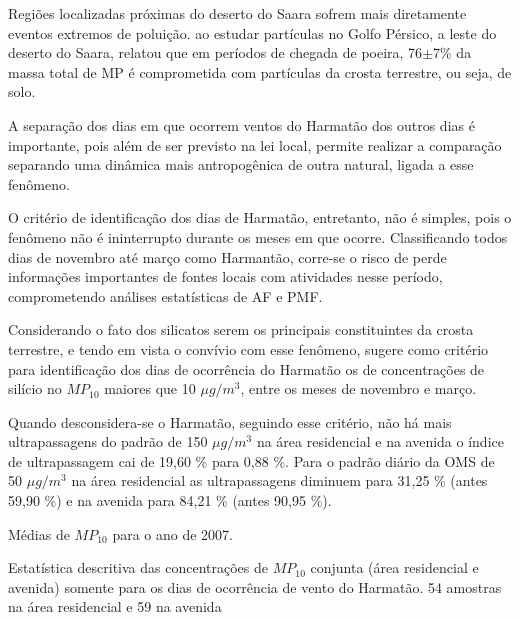 Regiões localizadas próximas do deserto do Saara sofrem mais diretamente 
eventos extremos de poluição. \citet{kaku2016} ao estudar partículas no 
Golfo Pérsico, a leste do deserto do Saara, relatou que em períodos de chegada 
de poeira, 76$\pm$7\% da massa total de MP é comprometida com partículas da 
crosta terrestre, ou seja, de solo.

A separação dos dias em que ocorrem ventos do Harmatão dos outros dias é 
importante, pois além de ser previsto na lei local, permite realizar a 
comparação separando uma dinâmica mais antropogênica de outra natural, 
ligada a esse fenômeno.
  
O critério de identificação dos dias de Harmatão, entretanto, não é simples, 
pois o fenômeno não é ininterrupto durante os meses em que ocorre. 
Classificando todos dias de novembro até março como Harmantão, corre-se o risco
de perde informações importantes de fontes locais com atividades nesse período, 
comprometendo análises estatísticas de AF e PMF. 

Considerando o fato dos silicatos serem os principais constituintes da crosta
terrestre, e tendo em vista o convívio com esse fenômeno, \citet{aboh2009} 
sugere como critério para identificação dos dias de ocorrência do Harmatão 
os de concentrações de silício no $MP_{10}$ maiores que 10 $\mu g/m^3$, 
entre os meses de novembro e março. 

Quando desconsidera-se o Harmatão, seguindo esse critério,
não há mais ultrapassagens do padrão de 150 $\mu g / m^3$ na área residencial 
e na avenida o índice de ultrapassagem cai de 19,60 \% para 0,88 \%. 
Para o padrão diário da OMS de 50 $\mu g / m^3$ na área residencial as 
ultrapassagens diminuem para 31,25 \% (antes 59,90 \%) e na avenida para 
84,21 \% (antes 90,95 \%).

\begin{table}[H]
  \centering
  
  \caption{Médias de $MP_{10}$ para o ano de 2007. \label{ddd}}
\end{table}

\begin{table}[H]
  \centering
  
  \caption{Estatística descritiva das concentrações de $MP_{10}$ conjunta
           (área residencial e avenida) somente para os dias de ocorrência 
           de vento do Harmatão. 54 amostras na área residencial e 59 na avenida 
          \label{table:descriptive_inalavel_harmatao}}
\end{table}

